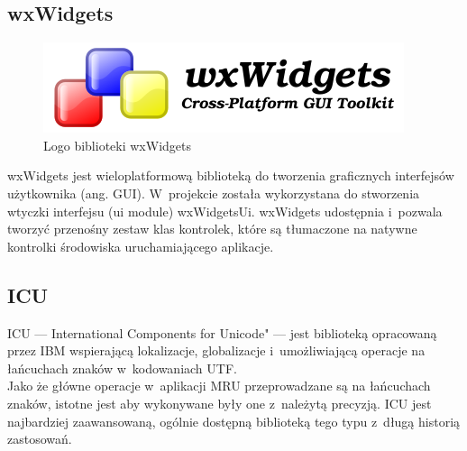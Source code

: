 

\subsection{wxWidgets}
\begin{figure}
\begin{center}
\includegraphics[scale=0.50]{img/wxwidgets_logo.png}
\end{center}
\caption{Logo biblioteki wxWidgets}
\end{figure}

\par
wxWidgets jest wieloplatformową biblioteką do tworzenia graficznych interfejsów użytkownika (ang. GUI). W~projekcie została wykorzystana do stworzenia wtyczki interfejsu (ui module) wxWidgetsUi. wxWidgets udostępnia i~pozwala tworzyć przenośny zestaw klas kontrolek, które są tłumaczone na natywne kontrolki środowiska uruchamiającego aplikacje.

\subsection{ICU}
\par
ICU --- International Components for Unicode" --- jest biblioteką opracowaną przez IBM wspierającą lokalizacje, globalizacje i~umożliwiającą operacje na łańcuchach znaków w~kodowaniach UTF.\\
Jako że główne operacje w~aplikacji MRU przeprowadzane są na łańcuchach znaków, istotne jest aby wykonywane były one z~należytą precyzją. ICU jest najbardziej zaawansowaną, ogólnie dostępną biblioteką tego typu z~długą historią zastosowań.

